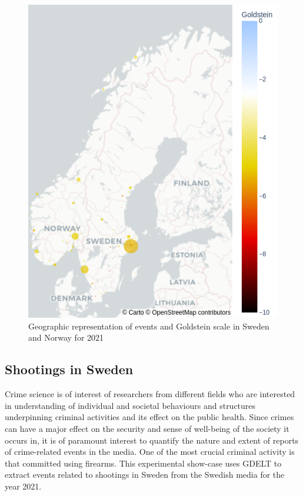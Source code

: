 \documentclass[a4, 11pt]{article}
\begin{document}
\begin{figure}[ht]
    \centering
    \includegraphics[scale=0.60,angle=90]{Images/sweden_norway_geo.png}
    \caption{Geographic representation of events and Goldstein scale in Sweden and Norway for 2021} 
    \label{fig:sweden_norway_geo}
\end{figure}


 \subsection{Shootings in Sweden}

Crime science is of interest of researchers from different fields who are interested in 
understanding of individual and societal behaviours and structures underpinning criminal 
activities and its effect on the public health. Since crimes can have a major
 effect on the security and sense of well-being of the society it occurs in, 
 it is of paramount interest to quantify the nature and extent of reports of crime-related 
 events in the media. 
 One of the most crucial criminal activity is that committed using firearms. 
 This experimental show-case uses GDELT to extract events related to
 shootings in Sweden from the Swedish media for the year 2021.
\end{document}
